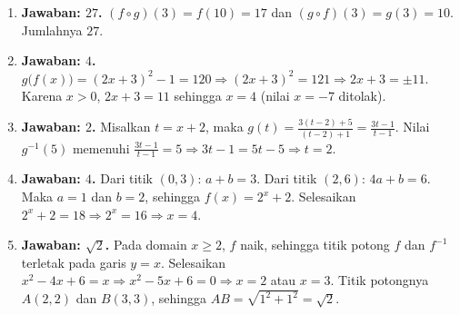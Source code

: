 \documentclass[a4paper,11pt]{article}
\newcommand{\dis}{\displaystyle}
\newcounter{no}
\begin{document}
\par{}\par\vspace{0.2em}
\small\begin{enumerate}[leftmargin=2em,itemsep=2pt,topsep=2pt]
\item[\textbf{1.}] \textbf{Jawaban: $27$.} $(f\circ g)(3)=f(10)=17$ dan $(g\circ f)(3)=g(3)=10$. Jumlahnya $27$.
\item[\textbf{2.}] \textbf{Jawaban: $4$.} $g\big(f(x)\big)=(2x+3)^2-1=120\Rightarrow(2x+3)^2=121\Rightarrow2x+3=\pm11$. Karena $x>0$, $2x+3=11$ sehingga $x=4$ (nilai $x=-7$ ditolak).
\item[\textbf{3.}] \textbf{Jawaban: $2$.} Misalkan $t=x+2$, maka $g(t)=\dis\frac{3(t-2)+5}{(t-2)+1}=\dis\frac{3t-1}{t-1}$. Nilai $g^{-1}(5)$ memenuhi $\dis\frac{3t-1}{t-1}=5\Rightarrow3t-1=5t-5\Rightarrow t=2$.
\item[\textbf{4.}] \textbf{Jawaban: $4$.} Dari titik $(0,3)$: $a+b=3$. Dari titik $(2,6)$: $4a+b=6$. Maka $a=1$ dan $b=2$, sehingga $f(x)=2^x+2$. Selesaikan $2^x+2=18\Rightarrow2^x=16\Rightarrow x=4$.
\item[\textbf{5.}] \textbf{Jawaban: $\sqrt{2}$.} Pada domain $x\ge2$, $f$ naik, sehingga titik potong $f$ dan $f^{-1}$ terletak pada garis $y=x$. Selesaikan $x^2-4x+6=x\Rightarrow x^2-5x+6=0\Rightarrow x=2$ atau $x=3$. Titik potongnya $A(2,2)$ dan $B(3,3)$, sehingga $AB=\sqrt{1^2+1^2}=\sqrt2$.
\end{enumerate}
\par{}\par\vspace{0.2em}
\end{document}
